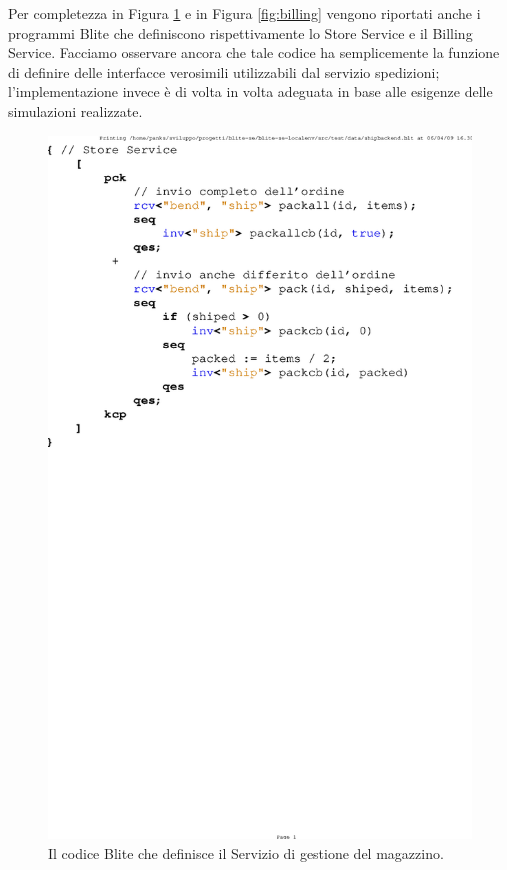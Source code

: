 Per completezza in Figura \ref{fig:store} e in Figura \ref{fig:billing} vengono
riportati anche i programmi Blite che definiscono rispettivamente lo Store
Service e il Billing Service. Facciamo osservare ancora che tale codice ha semplicemente la
funzione di definire delle interfacce verosimili utilizzabili dal servizio
spedizioni; l'implementazione invece è di volta in volta adeguata in base alle
esigenze delle simulazioni realizzate.
\\

\begin{figure}[p!]
\begin{center}
  \includegraphics[scale=0.80,clip]{blide/dia/store}
   \caption[Codice Blite, interfaccia Store Service]{Il codice Blite che
   definisce il Servizio di gestione del magazzino.}
  \label{fig:store}
\end{center}
\end{figure}

